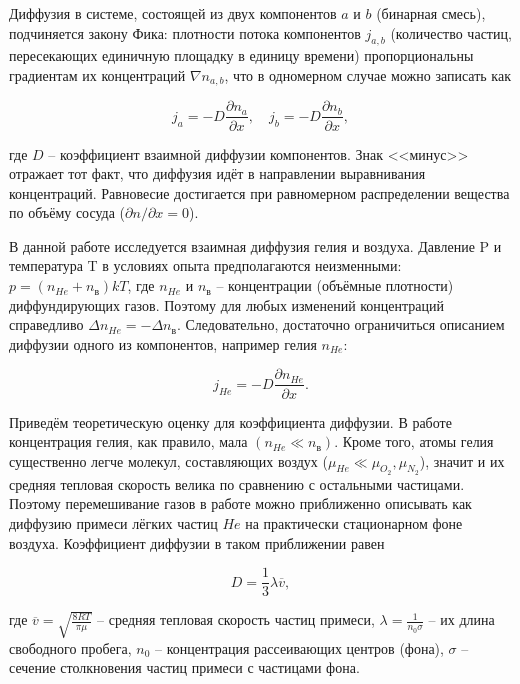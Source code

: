 \documentclass[a4paper,12pt]{article} %
\begin{document}
\medskip

\noindent Диффузия в системе, состоящей из двух компонентов $ a $ и $ b $ (бинарная смесь), подчиняется закону Фика: плотности потока компонентов $ j_{a,b} $ (количество частиц, пересекающих единичную площадку в единицу времени) пропорциональны градиентам их концентраций $ \nabla n_{a,b}$, что в одномерном случае можно записать как

\[ j_a = -D\frac{\partial n_a}{\partial x}, \quad j_b = -D\frac{\partial n_b}{\partial x}, \]

\noindent где $ D $ -- коэффициент взаимной диффузии компонентов. Знак <<минус>> отражает тот факт, что диффузия идёт в направлении выравнивания концентраций. Равновесие достигается при равномерном распределении вещества по объёму сосуда ($ \partial n / \partial x = 0 $).

\medskip

\noindent В данной работе исследуется взаимная диффузия гелия и воздуха. Давление P и температура T в условиях опыта предполагаются неизменными: $ p=(n_{He}+n_{\text{в}})kT $, где $ n_{He} $ и $ n_{\text{в}} $ -- концентрации (объёмные плотности) диффундирующих газов. Поэтому для любых изменений концентраций справедливо $ \Delta n_{He}=-\Delta n_{\text{в}} $. Следовательно, достаточно ограничиться описанием диффузии одного из компонентов, например гелия $ n_{He} $:

\begin{equation}\label{1}
j_{He}=-D\frac{\partial n_{He}}{\partial x}.
\end{equation}

\noindent Приведём теоретическую оценку для коэффициента диффузии. В работе концентрация гелия, как правило, мала $ (n_{He} \ll n_\text{в}) $. Кроме того, атомы гелия существенно легче молекул, составляющих воздух ($ \mu_{He} \ll \mu_{O_2}, \mu_{N_2} $), значит и их средняя тепловая скорость велика по сравнению с остальными частицами. Поэтому перемешивание газов в работе можно приближенно описывать как диффузию примеси лёгких частиц $ He $ на практически стационарном фоне воздуха. Коэффициент диффузии в таком приближении равен

\begin{equation}\label{2}
D=\frac{1}{3}\lambda \overline{v},
\end{equation}

\noindent где $ \overline{v}=\sqrt{\frac{8RT}{\pi \mu}} $ -- средняя тепловая скорость частиц примеси, $ \lambda = \frac{1}{n_0\sigma} $ -- их длина свободного пробега, $ n_0 $ -- концентрация рассеивающих центров (фона), $ \sigma $ -- сечение столкновения частиц примеси с частицами фона.
\end{document}
